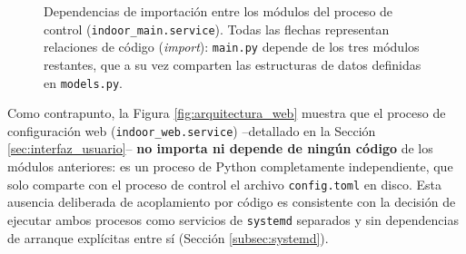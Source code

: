 \begin{figure}[htbp]
\caption{Dependencias de importación entre los módulos del proceso de control (\texttt{indoor\_main.service}). Todas las flechas representan relaciones de código (\textit{import}): \texttt{main.py} depende de los tres módulos restantes, que a su vez comparten las estructuras de datos definidas en \texttt{models.py}.}
\label{fig:arquitectura_control}
\end{figure}

Como contrapunto, la Figura \ref{fig:arquitectura_web} muestra que el proceso de configuración web (\texttt{indoor\_web.service}) --detallado en la Sección \ref{sec:interfaz_usuario}-- \textbf{no importa ni depende de ningún código} de los módulos anteriores: es un proceso de Python completamente independiente, que solo comparte con el proceso de control el archivo \texttt{config.toml} en disco. Esta ausencia deliberada de acoplamiento por código es consistente con la decisión de ejecutar ambos procesos como servicios de \texttt{systemd} separados y sin dependencias de arranque explícitas entre sí (Sección \ref{subsec:systemd}).

